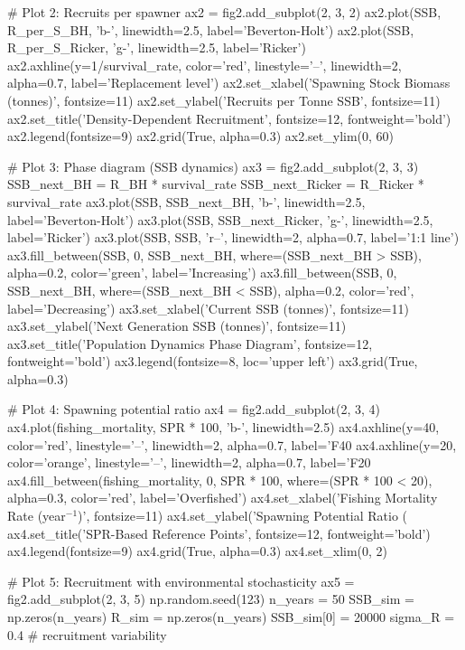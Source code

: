 \documentclass[a4paper, 11pt]{article}
\begin{document}
\begin{pycode}
# Plot 2: Recruits per spawner
ax2 = fig2.add_subplot(2, 3, 2)
ax2.plot(SSB, R_per_S_BH, 'b-', linewidth=2.5, label='Beverton-Holt')
ax2.plot(SSB, R_per_S_Ricker, 'g-', linewidth=2.5, label='Ricker')
ax2.axhline(y=1/survival_rate, color='red', linestyle='--', linewidth=2, alpha=0.7,
            label='Replacement level')
ax2.set_xlabel('Spawning Stock Biomass (tonnes)', fontsize=11)
ax2.set_ylabel('Recruits per Tonne SSB', fontsize=11)
ax2.set_title('Density-Dependent Recruitment', fontsize=12, fontweight='bold')
ax2.legend(fontsize=9)
ax2.grid(True, alpha=0.3)
ax2.set_ylim(0, 60)

# Plot 3: Phase diagram (SSB dynamics)
ax3 = fig2.add_subplot(2, 3, 3)
SSB_next_BH = R_BH * survival_rate
SSB_next_Ricker = R_Ricker * survival_rate
ax3.plot(SSB, SSB_next_BH, 'b-', linewidth=2.5, label='Beverton-Holt')
ax3.plot(SSB, SSB_next_Ricker, 'g-', linewidth=2.5, label='Ricker')
ax3.plot(SSB, SSB, 'r--', linewidth=2, alpha=0.7, label='1:1 line')
ax3.fill_between(SSB, 0, SSB_next_BH, where=(SSB_next_BH > SSB),
                  alpha=0.2, color='green', label='Increasing')
ax3.fill_between(SSB, 0, SSB_next_BH, where=(SSB_next_BH < SSB),
                  alpha=0.2, color='red', label='Decreasing')
ax3.set_xlabel('Current SSB (tonnes)', fontsize=11)
ax3.set_ylabel('Next Generation SSB (tonnes)', fontsize=11)
ax3.set_title('Population Dynamics Phase Diagram', fontsize=12, fontweight='bold')
ax3.legend(fontsize=8, loc='upper left')
ax3.grid(True, alpha=0.3)

# Plot 4: Spawning potential ratio
ax4 = fig2.add_subplot(2, 3, 4)
ax4.plot(fishing_mortality, SPR * 100, 'b-', linewidth=2.5)
ax4.axhline(y=40, color='red', linestyle='--', linewidth=2, alpha=0.7,
            label='F40%
ax4.axhline(y=20, color='orange', linestyle='--', linewidth=2, alpha=0.7,
            label='F20%
ax4.fill_between(fishing_mortality, 0, SPR * 100, where=(SPR * 100 < 20),
                  alpha=0.3, color='red', label='Overfished')
ax4.set_xlabel('Fishing Mortality Rate (year$^{-1}$)', fontsize=11)
ax4.set_ylabel('Spawning Potential Ratio (\\%
ax4.set_title('SPR-Based Reference Points', fontsize=12, fontweight='bold')
ax4.legend(fontsize=9)
ax4.grid(True, alpha=0.3)
ax4.set_xlim(0, 2)

# Plot 5: Recruitment with environmental stochasticity
ax5 = fig2.add_subplot(2, 3, 5)
np.random.seed(123)
n_years = 50
SSB_sim = np.zeros(n_years)
R_sim = np.zeros(n_years)
SSB_sim[0] = 20000
sigma_R = 0.4  # recruitment variability


\end{pycode}
\end{document}
